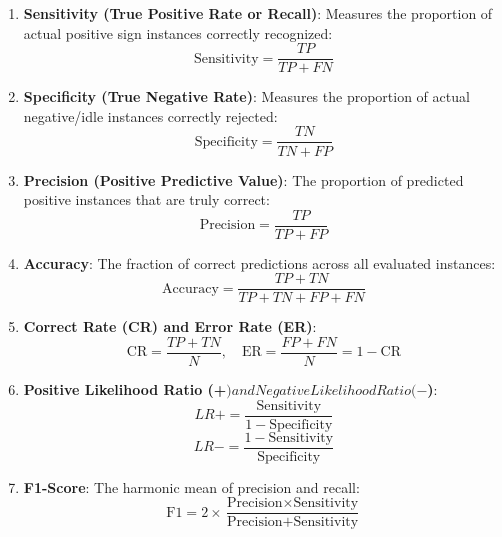 \begin{enumerate}
    \item \textbf{Sensitivity (True Positive Rate or Recall)}: Measures the proportion of actual positive sign instances correctly recognized:
    \begin{equation}
        \text{Sensitivity} = \frac{TP}{TP + FN}
    \end{equation}
    \item \textbf{Specificity (True Negative Rate)}: Measures the proportion of actual negative/idle instances correctly rejected:
    \begin{equation}
        \text{Specificity} = \frac{TN}{TN + FP}
    \end{equation}
    \item \textbf{Precision (Positive Predictive Value)}: The proportion of predicted positive instances that are truly correct:
    \begin{equation}
        \text{Precision} = \frac{TP}{TP + FP}
    \end{equation}
    \item \textbf{Accuracy}: The fraction of correct predictions across all evaluated instances:
    \begin{equation}
        \text{Accuracy} = \frac{TP + TN}{TP + TN + FP + FN}
    \end{equation}
    \item \textbf{Correct Rate (CR) and Error Rate (ER)}:
    \begin{equation}
        \text{CR} = \frac{TP + TN}{N}, \quad \text{ER} = \frac{FP + FN}{N} = 1 - \text{CR}
    \end{equation}
    \item \textbf{Positive Likelihood Ratio (+$) and Negative Likelihood Ratio (-$)}:
    \begin{equation}
        LR+ = \frac{\text{Sensitivity}}{1 - \text{Specificity}}
    \end{equation}
    \begin{equation}
        LR- = \frac{1 - \text{Sensitivity}}{\text{Specificity}}
    \end{equation}
    \item \textbf{F1-Score}: The harmonic mean of precision and recall:
    \begin{equation}
        \text{F1} = 2 \times \frac{\text{Precision} \times \text{Sensitivity}}{\text{Precision} + \text{Sensitivity}}
    \end{equation}
\end{enumerate}

